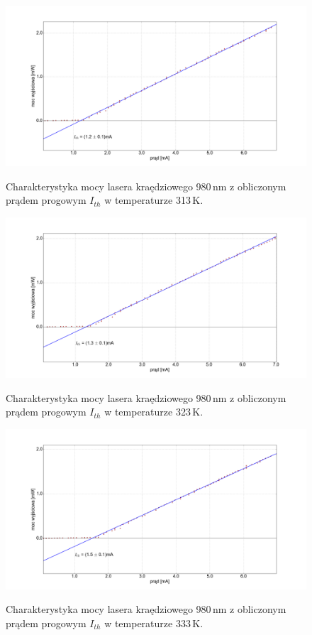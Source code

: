 \documentclass[a4paper, portrait,12pt]{report}
\begin{document}
\begin{figure}
\center
  \includegraphics[scale=0.30]{plot980/temp_40_fit.png}
  \label{rys1}
  \caption{Charakterystyka mocy lasera kraędziowego 980\,nm z obliczonym prądem progowym $I_{th}$  w temperaturze 313\,K.} 
\end{figure}

\begin{figure}
\center
  \includegraphics[scale=0.30]{plot980/temp_50_fit.png}
  \label{rys1}
  \caption{Charakterystyka mocy lasera kraędziowego 980\,nm z obliczonym prądem progowym $I_{th}$  w temperaturze 323\,K.} 
\end{figure}

\begin{figure}
\center
  \includegraphics[scale=0.30]{plot980/temp_60_fit.png}
  \label{rys1}
  \caption{Charakterystyka mocy lasera kraędziowego 980\,nm z obliczonym prądem progowym $I_{th}$  w temperaturze 333\,K.} 
\end{figure}
\end{document}
